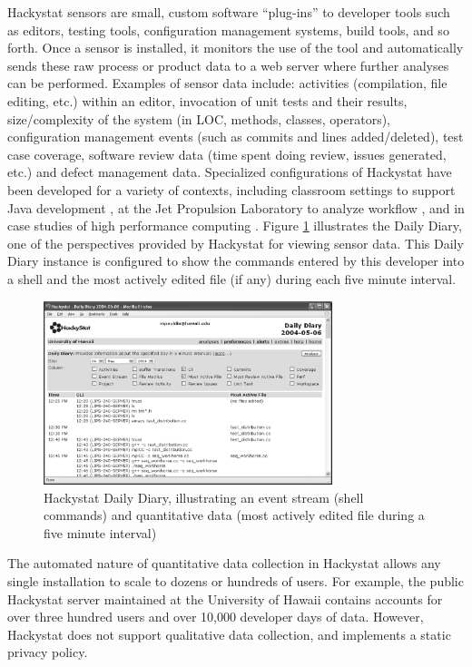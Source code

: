Hackystat sensors are small, custom software ``plug-ins'' to developer
tools such as editors, testing tools, configuration management systems,
build tools, and so forth. Once a sensor is installed, it monitors the use
of the tool and automatically sends these raw process or product data to a
web server where further analyses can be performed.  Examples of sensor
data include: activities (compilation, file editing, etc.) within an
editor, invocation of unit tests and their results, size/complexity of the
system (in LOC, methods, classes, operators), configuration management
events (such as commits and lines added/deleted), test case coverage,
software review data (time spent doing review, issues generated, etc.) and
defect management data.  Specialized configurations of Hackystat have been
developed for a variety of contexts, including classroom settings to
support Java development \cite{csdl2-03-12}, at the Jet Propulsion
Laboratory to analyze workflow \cite{csdl2-03-07}, and in case studies of
high performance computing \cite{csdl2-04-22}.  Figure \ref{fig:dailydiary}
illustrates the Daily Diary, one of the perspectives provided by Hackystat
for viewing sensor data. This Daily Diary instance is configured to show
the commands entered by this developer into a shell and the most actively
edited file (if any) during each five minute interval. 

\begin{figure}[ht]
  \centering
  \includegraphics[width=0.75\textwidth]{truss.commandlineinvocations.eps}
  \caption{Hackystat Daily Diary, illustrating an event stream (shell commands) 
and quantitative data (most actively edited file during a five minute interval)}
  \label{fig:dailydiary}
\end{figure}

The automated nature of quantitative data collection in Hackystat
allows any single installation to scale to dozens or hundreds of users.
For example, the public Hackystat server maintained at the University of
Hawaii contains accounts for over three hundred users and over 10,000
developer days of data. However, Hackystat does not support qualitative
data collection, and implements a static privacy policy.  

